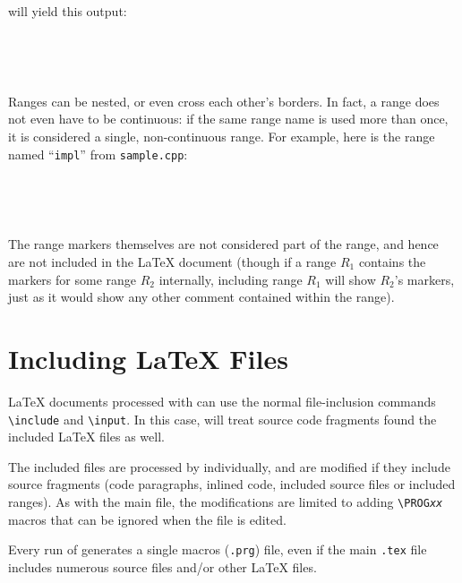 \documentclass[twoside,12pt]{article}
\newcommand{\bs}{\textbackslash}
\begin{document}
will yield this output:

~


~

Ranges can be nested, or even cross each other's borders.
In fact, a range does not even have to be continuous: if the same range
    name is used more than once, it is considered a single, non-continuous
    range.
For example, here is the range named ``\texttt{impl}'' from \texttt{sample.cpp}:

~


~

The range markers themselves are not considered part of the range, and
    hence are not included in the \LaTeX{} document (though if a range
    $R_1$ contains the markers for some range $R_2$ internally,
    including range $R_1$ will show $R_2$'s markers, just as it would
    show any other comment contained within the range).

\section{Including \LaTeX{} Files}
\label{Section:Including:Latex:Files}

\LaTeX{} documents processed with \progtex{} can use the normal
    file-inclusion commands \texttt{\bs{}include} and \texttt{\bs{}input}.
In this case, \progtex{} will treat source code fragments found the included
    \LaTeX{} files as well.



The included files are processed by \progtex{} individually, and are modified
    if they include source fragments (code paragraphs, inlined code, included
    source files or included ranges). As with the main file, the modifications
    are limited to adding \texttt{\bs{}PROG\textit{xx}} macros that
    can be ignored when the file is edited.

Every run of \progtex{} generates a single macros (\texttt{.prg}) file, even if
    the main \texttt{.tex} file includes numerous source files and/or other
    \LaTeX{} files.
\end{document}
